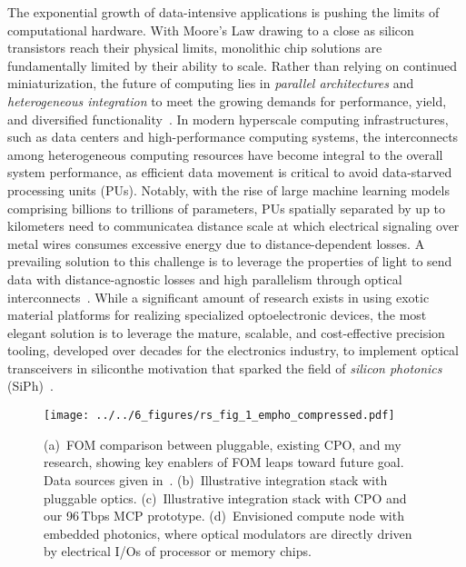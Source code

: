 The exponential growth of data-intensive applications is pushing the limits of computational hardware. With Moore's Law drawing to a close as silicon transistors reach their physical limits, monolithic chip solutions are fundamentally limited by their ability to scale. Rather than relying on continued miniaturization, the future of computing lies in \emph{parallel architectures} and \emph{heterogeneous integration} to meet the growing demands for performance, yield, and diversified functionality~\cite{iyerHeterogeneousIntegrationPerformance2016}. In modern hyperscale computing infrastructures, such as data centers and high-performance computing systems, the interconnects among heterogeneous computing resources have become integral to the overall system performance, as efficient data movement is critical to avoid data-starved processing units (PUs). Notably, with the rise of large machine learning models comprising billions to trillions of parameters, PUs spatially separated by up to kilometers need to communicate\textemdash{}a distance scale at which electrical signaling over metal wires consumes excessive energy due to distance-dependent losses. A prevailing solution to this challenge is to leverage the properties of light to send data with distance-agnostic losses and high parallelism through optical interconnects~\cite{millerRationaleChallengesOptical2000}. While a significant amount of research exists in using exotic material platforms for realizing specialized optoelectronic devices, the most elegant solution is to leverage the mature, scalable, and cost-effective precision tooling, developed over decades for the electronics industry, to implement optical transceivers in silicon\textemdash{}the motivation that sparked the field of \emph{silicon photonics} (SiPh)~\cite{sorefPresentFutureSilicon2006}.

\begin{wrapfigure}{r}{0.4\textwidth}
    \vspace{-1em}
    \begin{center}
        \texttt{[image: ../../6\_figures/rs\_fig\_1\_empho\_compressed.pdf]}
    \end{center}
    \caption{(a)~FOM comparison between pluggable, existing CPO, and my research, showing key enablers of FOM leaps toward future goal. Data sources given in~\cite{wangCoDesignedSiliconPhotonics2024}. (b)~Illustrative integration stack with pluggable optics. (c)~Illustrative integration stack with CPO and our 96\,Tbps MCP prototype. (d)~Envisioned compute node with embedded photonics, where optical modulators are directly driven by electrical I/Os of processor or memory chips.}
    \label{fig:embedded_photonics}
    \vspace{-2.5em}
\end{wrapfigure}

